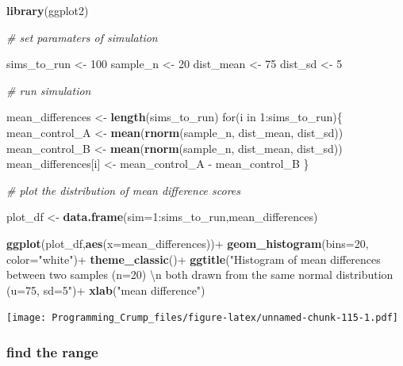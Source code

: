 \documentclass[]{book}
\newenvironment{Shaded}{\begin{snugshade}}{\end{snugshade}}
\newcommand{\KeywordTok}[1]{\textcolor[rgb]{0.13,0.29,0.53}{\textbf{{#1}}}}
\newcommand{\DataTypeTok}[1]{\textcolor[rgb]{0.13,0.29,0.53}{{#1}}}
\newcommand{\DecValTok}[1]{\textcolor[rgb]{0.00,0.00,0.81}{{#1}}}
\newcommand{\CharTok}[1]{\textcolor[rgb]{0.31,0.60,0.02}{{#1}}}
\newcommand{\StringTok}[1]{\textcolor[rgb]{0.31,0.60,0.02}{{#1}}}
\newcommand{\CommentTok}[1]{\textcolor[rgb]{0.56,0.35,0.01}{\textit{{#1}}}}
\newcommand{\NormalTok}[1]{{#1}}
\theoremstyle{definition}
\theoremstyle{definition}
\theoremstyle{definition}
\theoremstyle{remark}
\begin{document}
\begin{Shaded}
\begin{Highlighting}[]
\KeywordTok{library}\NormalTok{(ggplot2)}

\CommentTok{# set paramaters of simulation}

\NormalTok{sims_to_run <-}\StringTok{ }\DecValTok{100}
\NormalTok{sample_n   <-}\StringTok{ }\DecValTok{20}
\NormalTok{dist_mean  <-}\StringTok{ }\DecValTok{75}
\NormalTok{dist_sd    <-}\StringTok{ }\DecValTok{5}

\CommentTok{# run simulation}

\NormalTok{mean_differences <-}\StringTok{ }\KeywordTok{length}\NormalTok{(sims_to_run)}
\NormalTok{for(i in }\DecValTok{1}\NormalTok{:sims_to_run)\{}
  \NormalTok{mean_control_A      <-}\StringTok{ }\KeywordTok{mean}\NormalTok{(}\KeywordTok{rnorm}\NormalTok{(sample_n, dist_mean, dist_sd))}
  \NormalTok{mean_control_B      <-}\StringTok{ }\KeywordTok{mean}\NormalTok{(}\KeywordTok{rnorm}\NormalTok{(sample_n, dist_mean, dist_sd))}
  \NormalTok{mean_differences[i] <-}\StringTok{ }\NormalTok{mean_control_A -}\StringTok{ }\NormalTok{mean_control_B}
\NormalTok{\}}

\CommentTok{# plot the  distribution of mean difference scores}

\NormalTok{plot_df <-}\StringTok{ }\KeywordTok{data.frame}\NormalTok{(}\DataTypeTok{sim=}\DecValTok{1}\NormalTok{:sims_to_run,mean_differences)}

\KeywordTok{ggplot}\NormalTok{(plot_df,}\KeywordTok{aes}\NormalTok{(}\DataTypeTok{x=}\NormalTok{mean_differences))+}
\StringTok{  }\KeywordTok{geom_histogram}\NormalTok{(}\DataTypeTok{bins=}\DecValTok{20}\NormalTok{, }\DataTypeTok{color=}\StringTok{"white"}\NormalTok{)+}
\StringTok{  }\KeywordTok{theme_classic}\NormalTok{()+}
\StringTok{  }\KeywordTok{ggtitle}\NormalTok{(}\StringTok{"Histogram of mean differences between two samples (n=20) }\CharTok{\textbackslash{}n}
\StringTok{          both drawn from the same normal distribution (u=75, sd=5"}\NormalTok{)+}
\StringTok{  }\KeywordTok{xlab}\NormalTok{(}\StringTok{"mean difference"}\NormalTok{)}
\end{Highlighting}
\end{Shaded}

\texttt{[image: Programming\_Crump\_files/figure-latex/unnamed-chunk-115-1.pdf]}

\subsubsection{find the range}\label{find-the-range}
\end{document}

